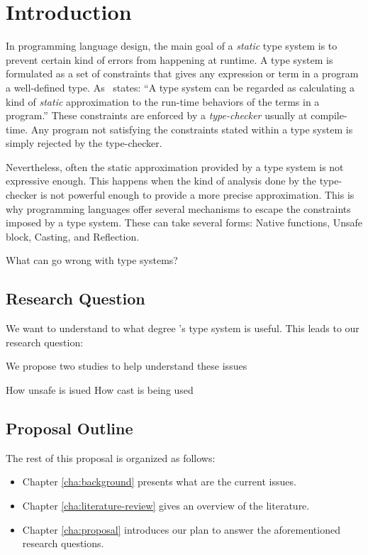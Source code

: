 
\chapter{Introduction}

In programming language design, the main goal of a \emph{static} type system is to prevent certain kind of errors from happening at runtime.
A type system is formulated as a set of constraints that gives any expression or term in a program a well-defined type.
As~\cite{pierceTypesProgrammingLanguages2002} states: ``A type system can be regarded as calculating a kind of \emph{static} approximation to the run-time behaviors of the terms in a program.''
These constraints are enforced by a \emph{type-checker} usually at compile-time.
Any program not satisfying the constraints stated within a type system is simply rejected by the type-checker.

Nevertheless, often the static approximation provided by a type system is not expressive enough.
This happens when the kind of analysis done by the type-checker is not powerful enough to provide a more precise approximation.
This is why programming languages offer several mechanisms to escape the constraints imposed by a type system.
These can take several forms: 
Native functions, Unsafe block, Casting, and Reflection.


What can go wrong with type systems?

\section{Research Question}

We want to understand to what degree \java{}'s type system is useful.
This leads to our research question:


We propose two studies to help understand these issues

How unsafe is isued
How cast is being used

\section{Proposal Outline}

The rest of this proposal is organized as follows:

\begin{itemize}
\item Chapter \ref{cha:background} presents what are the current issues.
\item Chapter \ref{cha:literature-review} gives an overview of the literature.
\item Chapter \ref{cha:proposal} introduces our plan to answer the aforementioned research questions.
\end{itemize}
